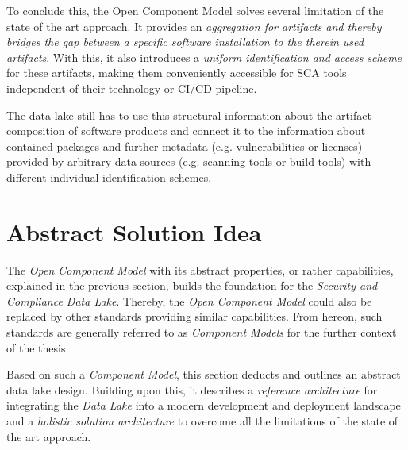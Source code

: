 To conclude this, the Open Component Model solves several limitation of the state of the art approach. It provides an \emph{aggregation for artifacts and thereby bridges the gap between a specific software installation to the therein used artifacts}. With this, it also introduces a \emph{uniform identification and access scheme} for these artifacts, making them conveniently accessible for SCA tools independent of their technology or CI/CD pipeline.\par
The data lake still has to use this structural information about the artifact composition of software products and connect it to the information about contained packages and further metadata (e.g. vulnerabilities or licenses) provided by arbitrary data sources (e.g. scanning tools or build tools) with different individual identification schemes. 

\section{Abstract Solution Idea}
The \emph{Open Component Model} with its abstract properties, or rather capabilities, explained in the previous section, builds the foundation for the \emph{Security and Compliance Data Lake}. Thereby, the \emph{Open Component Model} could also be replaced by other standards providing similar capabilities. From hereon, such standards are generally referred to as \emph{Component Models} for the further context of the thesis.\par
Based on such a \emph{Component Model}, this section deducts and outlines an abstract data lake design. Building upon this, it describes a \emph{reference architecture} for integrating the \emph{Data Lake} into a modern development and deployment landscape and a \emph{holistic solution architecture} to overcome all the limitations of the state of the art approach.

